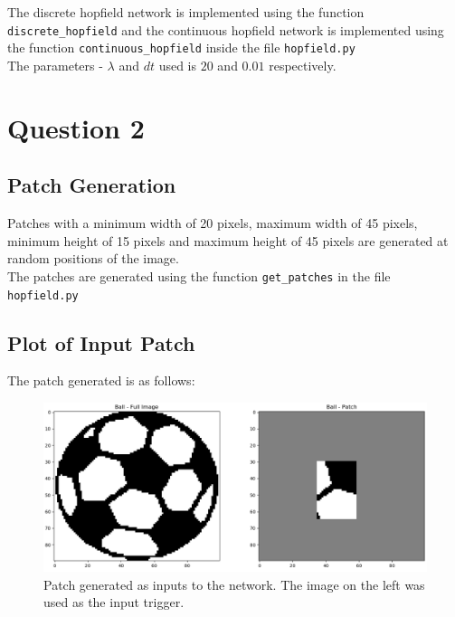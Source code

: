 \documentclass[12pt,a4paper]{article}
\newcommand{\noi}{\noindent}
\def\tt#1{\texttt{#1}}
\begin{document}
\noi
The discrete hopfield network is implemented using the function \tt{discrete\_hopfield} and the continuous hopfield network is implemented using the function \tt{continuous\_hopfield} inside the file \tt{hopfield.py}\\

\noi
The parameters - $\lambda$ and $dt$ used is $20$ and $0.01$ respectively.

\break
\section{Question 2}
\subsection{Patch Generation}
Patches with a minimum width of 20 pixels, maximum width of 45 pixels, minimum height of 15 pixels and maximum height of 45 pixels are generated at random positions of the image.\\

\noi
The patches are generated using the function \tt{get\_patches} in the file \tt{hopfield.py}


\subsection{Plot of Input Patch}
The patch generated is as follows:
\begin{figure}[H]
\centering
\includegraphics[scale=0.4]{images/ball_patch.png}
\caption{Patch generated as inputs to the network. The image on the left was used as the input trigger.}
\end{figure}
\end{document}
